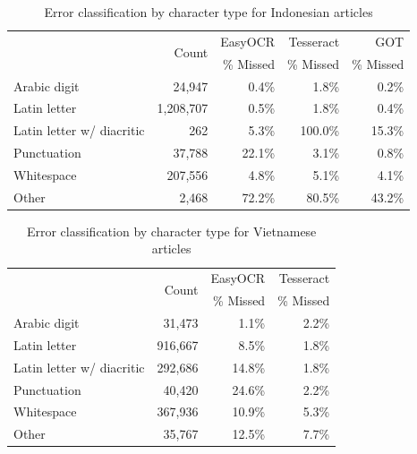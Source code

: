 \documentclass[12pt,oneside]{memoir}
\begin{document}
\begin{table}[ht]
    \caption{Error classification by character type for Indonesian articles}
    \label{table:indonesian-error-classification}
    \centering
    \begin{tabular}{lrrrr}
        \toprule
        & \multirow{2}{*}{Count} & EasyOCR & Tesseract & GOT\\
        & & \% Missed & \% Missed & \% Missed\\
        \midrule
        Arabic digit & 24,947 & 0.4\% & 1.8\% & 0.2\%\\
        Latin letter & 1,208,707 & 0.5\% & 1.8\% & 0.4\%\\
        Latin letter w/ diacritic & 262 & 5.3\% & 100.0\% & 15.3\%\\
        Punctuation & 37,788 & 22.1\% & 3.1\% & 0.8\%\\
        Whitespace & 207,556 & 4.8\% & 5.1\% & 4.1\%\\
        Other & 2,468 & 72.2\% & 80.5\% & 43.2\%\\
        \bottomrule
    \end{tabular}
\end{table}

\begin{table}[ht]
    \caption{Error classification by character type for Vietnamese articles}
    \label{table:vietnamese-error-classification}
    \centering
    \begin{tabular}{lrrr}
        \toprule
        & \multirow{2}{*}{Count} & EasyOCR & Tesseract\\
        & & \% Missed & \% Missed\\
        \midrule
        Arabic digit & 31,473 & 1.1\% & 2.2\%\\
        Latin letter & 916,667 & 8.5\% & 1.8\%\\
        Latin letter w/ diacritic & 292,686 & 14.8\% & 1.8\%\\
        Punctuation & 40,420 & 24.6\% & 2.2\%\\
        Whitespace & 367,936 & 10.9\% & 5.3\%\\
        Other & 35,767 & 12.5\% & 7.7\%\\
        \bottomrule
    \end{tabular}
\end{table}
\end{document}
